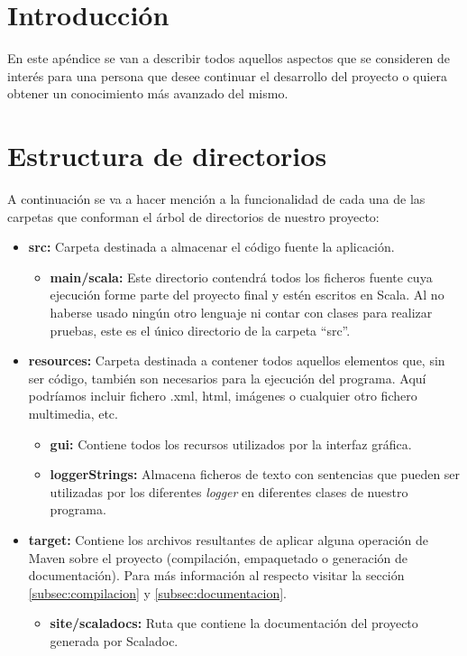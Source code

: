 

\section{Introducción}

En este apéndice se van a describir todos aquellos aspectos que se consideren de interés para una persona que desee continuar el desarrollo del proyecto o quiera obtener un conocimiento más avanzado del mismo.

\section{Estructura de directorios}

A continuación se va a hacer mención a la funcionalidad de cada una de las carpetas que conforman el árbol de directorios de nuestro proyecto:

\begin{itemize}
	\item \textbf{src:} Carpeta destinada a almacenar el código fuente la aplicación.
	\begin{itemize}
		\item \textbf{main/scala:} Este directorio contendrá todos los ficheros fuente cuya ejecución forme parte del proyecto final y estén escritos en Scala. Al no haberse usado ningún otro lenguaje ni contar con clases para realizar pruebas, este es el único directorio de la carpeta ``src''.
	\end{itemize}
	\item \textbf{resources:} Carpeta destinada a contener todos aquellos elementos que, sin ser código, también son necesarios para la ejecución del programa. Aquí podríamos incluir fichero .xml, html, imágenes o cualquier otro fichero multimedia, etc.
	\begin{itemize}
		\item \textbf{gui:} Contiene todos los recursos utilizados por la interfaz gráfica.
		\item \textbf{loggerStrings:} Almacena ficheros de texto con sentencias que pueden ser utilizadas por los diferentes \textit{logger} en diferentes clases de nuestro programa.
	\end{itemize}
	\item \textbf{target:} Contiene los archivos resultantes de aplicar alguna operación de Maven sobre el proyecto (compilación, empaquetado o generación de documentación). Para más información al respecto visitar la sección \ref{subsec:compilacion} y \ref{subsec:documentacion}.
	\begin{itemize}
		\item \textbf{site/scaladocs:} Ruta que contiene la documentación del proyecto generada por Scaladoc.
	\end{itemize}
\end{itemize}


